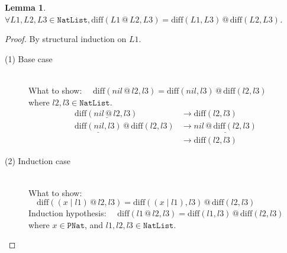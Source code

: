 \documentclass[12pt, a4paper]{article}
\newtheorem{lemma}[theorem]{Lemma}
\newcommand{\rel}[1]{\mathrel{#1}}
\newcommand{\rmx}[1]{\mathrm{#1}}
\newcommand{\larrow}{\longrightarrow}
\newcommand{\under}{\underline}
\begin{document}
\begin{lemma}
\label{lm1}
$\forall L1, L2, L3 \in \mathtt{NatList}, \rmx{diff}(L1 \rel{@} L2, L3) = \rmx{diff}(L1, L3) \rel{@} \rmx{diff}(L2, L3)$.
\end{lemma}
\begin{proof}
By structural induction on $L1$.

\begin{description}

\item[(1) Base case]~\\
\noindent
What to show: $\quad \rmx{diff}(nil \rel{@} l2, l3) = \rmx{diff}(nil, l3) \rel{@} \rmx{diff}(l2, l3)$ \\
where $l2, l3 \in \mathtt{NatList}$.
\begin{align*}
\rmx{diff}(\under{nil \rel{@} l2}, l3)
	&\larrow \rmx{diff}(l2, l3) \tag{by @1} \\
\under{\rmx{diff}(nil, l3)} \rel{@} \rmx{diff}(l2, l3)
	&\larrow \under{nil \rel{@} \rmx{diff}(l2, l3)} \tag{by diff1} \\
	&\larrow \rmx{diff}(l2, l3) \tag{by @1}
\end{align*}

\item[(2) Induction case]~\\
What to show: $\quad \rmx{diff}((x \rel{|} l1) \rel{@} l2, l3) = \rmx{diff}((x \rel{|} l1), l3) \rel{@} \rmx{diff}(l2, l3)$ \\
Induction hypothesis: $\quad \rmx{diff}(l1 \rel{@} l2, l3) = \rmx{diff}(l1, l3) \rel{@} \rmx{diff}(l2, l3)$  \\
where $x\in \mathtt{PNat}$, and $l1, l2, l3 \in \mathtt{NatList}$.


\end{description}
\end{proof}
\end{document}
